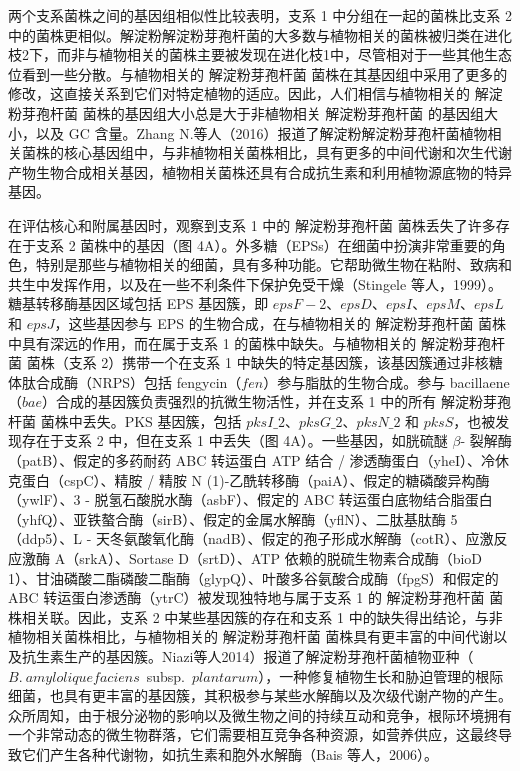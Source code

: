 \documentclass[UTF8]{ctexart}
\begin{document}
两个支系菌株之间的基因组相似性比较表明，支系 1 中分组在一起的菌株比支系 2 中的菌株更相似。解淀粉解淀粉芽孢杆菌的大多数与植物相关的菌株被归类在进化枝2下，而非与植物相关的菌株主要被发现在进化枝1中，尽管相对于一些其他生态位看到一些分散。与植物相关的 解淀粉芽孢杆菌 菌株在其基因组中采用了更多的修改，这直接关系到它们对特定植物的适应。因此，人们相信与植物相关的 解淀粉芽孢杆菌 菌株的基因组大小总是大于非植物相关 解淀粉芽孢杆菌 的基因组大小，以及 GC 含量。Zhang N.等人（2016）报道了解淀粉解淀粉芽孢杆菌植物相关菌株的核心基因组中，与非植物相关菌株相比，具有更多的中间代谢和次生代谢产物生物合成相关基因，植物相关菌株还具有合成抗生素和利用植物源底物的特异基因。

在评估核心和附属基因时，观察到支系 1 中的 解淀粉芽孢杆菌 菌株丢失了许多存在于支系 2 菌株中的基因（图 4A）。外多糖（EPSs）在细菌中扮演非常重要的角色，特别是那些与植物相关的细菌，具有多种功能。它帮助微生物在粘附、致病和共生中发挥作用，以及在一些不利条件下保护免受干燥（Stingele 等人，1999）。糖基转移酶基因区域包括 EPS 基因簇，即 $epsF-2$、$epsD$、$epsI$、$epsM$、$epsL$ 和 $epsJ$，这些基因参与 EPS 的生物合成，在与植物相关的 解淀粉芽孢杆菌 菌株中具有深远的作用，而在属于支系 1 的菌株中缺失。与植物相关的 解淀粉芽孢杆菌 菌株（支系 2）携带一个在支系 1 中缺失的特定基因簇，该基因簇通过非核糖体肽合成酶（NRPS）包括 fengycin（$fen$）参与脂肽的生物合成。参与 bacillaene（$bae$）合成的基因簇负责强烈的抗微生物活性，并在支系 1 中的所有 解淀粉芽孢杆菌 菌株中丢失。PKS 基因簇，包括 $pksI\_2$、$pksG\_2$、$pksN\_2$ 和 $pksS$，也被发现存在于支系 2 中，但在支系 1 中丢失（图 4A）。一些基因，如胱硫醚 $\beta$- 裂解酶（patB）、假定的多药耐药 ABC 转运蛋白 ATP 结合 / 渗透酶蛋白（yheI）、冷休克蛋白（cspC）、精胺 / 精胺 N (1)-乙酰转移酶（paiA）、假定的糖磷酸异构酶（ywlF）、3 - 脱氢石酸脱水酶（asbF）、假定的 ABC 转运蛋白底物结合脂蛋白（yhfQ）、亚铁螯合酶（sirB）、假定的金属水解酶（yflN）、二肽基肽酶 5（ddp5）、L - 天冬氨酸氧化酶（nadB）、假定的孢子形成水解酶（cotR）、应激反应激酶 A（srkA）、Sortase D（srtD）、ATP 依赖的脱硫生物素合成酶（bioD 1）、甘油磷酸二酯磷酸二酯酶（glypQ）、叶酸多谷氨酸合成酶（fpgS）和假定的 ABC 转运蛋白渗透酶（ytrC）被发现独特地与属于支系 1 的 解淀粉芽孢杆菌 菌株相关联。因此，支系 2 中某些基因簇的存在和支系 1 中的缺失得出结论，与非植物相关菌株相比，与植物相关的 解淀粉芽孢杆菌 菌株具有更丰富的中间代谢以及抗生素生产的基因簇。Niazi等人2014）报道了解淀粉芽孢杆菌植物亚种（$B.~amyloliquefaciens$~subsp.~$plantarum$），一种修复植物生长和胁迫管理的根际细菌，也具有更丰富的基因簇，其积极参与某些水解酶以及次级代谢产物的产生。众所周知，由于根分泌物的影响以及微生物之间的持续互动和竞争，根际环境拥有一个非常动态的微生物群落，它们需要相互竞争各种资源，如营养供应，这最终导致它们产生各种代谢物，如抗生素和胞外水解酶（Bais 等人，2006）。
\end{document}
